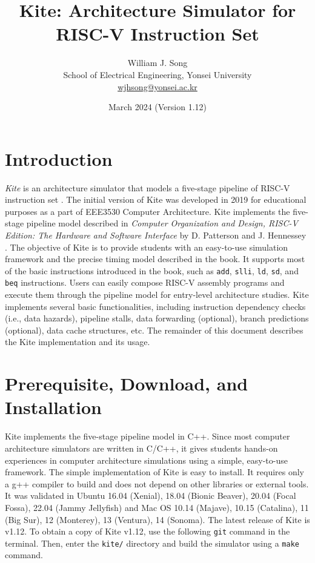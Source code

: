 \documentclass[10pt]{article}
\begin{document}
\title{Kite: Architecture Simulator for RISC-V Instruction Set}
\author{William J. Song\\
        School of Electrical Engineering, Yonsei University\\
        \href{mailto:wjhsong@yonsei.ac.kr}{wjhsong@yonsei.ac.kr}}
\date{March 2024 (Version 1.12)}
\maketitle


\section{Introduction} \label{sec:introduction}
\emph{Kite} is an architecture simulator that models a five-stage pipeline of RISC-V instruction set \cite{waterman_riscv2019}.
The initial version of Kite was developed in 2019 for educational purposes as a part of EEE3530 Computer Architecture.
Kite implements the five-stage pipeline model described in \emph{Computer Organization and Design, RISC-V Edition: The Hardware and Software Interface} by D. Patterson and J. Hennessey \cite{patterson_morgan2017}.
The objective of Kite is to provide students with an easy-to-use simulation framework and the precise timing model described in the book.
It supports most of the basic instructions introduced in the book, such as {\tt\small add}, {\tt\small slli}, {\tt\small ld}, {\tt\small sd}, and {\tt\small beq} instructions.
Users can easily compose RISC-V assembly programs and execute them through the pipeline model for entry-level architecture studies.
Kite implements several basic functionalities, including instruction dependency checks (i.e., data hazards), pipeline stalls, data forwarding (optional), branch predictions (optional), data cache structures, etc.
The remainder of this document describes the Kite implementation and its usage.


\section{Prerequisite, Download, and Installation} \label{sec:install}
Kite implements the five-stage pipeline model in C++.
Since most computer architecture simulators are written in C/C++, it gives students hands-on experiences in computer architecture simulations using a simple, easy-to-use framework.
The simple implementation of Kite is easy to install.
It requires only a g++ compiler to build and does not depend on other libraries or external tools.
It was validated in Ubuntu 16.04 (Xenial), 18.04 (Bionic Beaver), 20.04 (Focal Fossa), 22.04 (Jammy Jellyfish) and Mac OS 10.14 (Majave), 10.15 (Catalina), 11 (Big Sur), 12 (Monterey), 13 (Ventura), 14 (Sonoma).
The latest release of Kite is v1.12.
To obtain a copy of Kite v1.12, use the following {\tt\small git} command in the terminal.
Then, enter the {\tt\small kite/} directory and build the simulator using a {\tt\small make} command.
\end{document}
